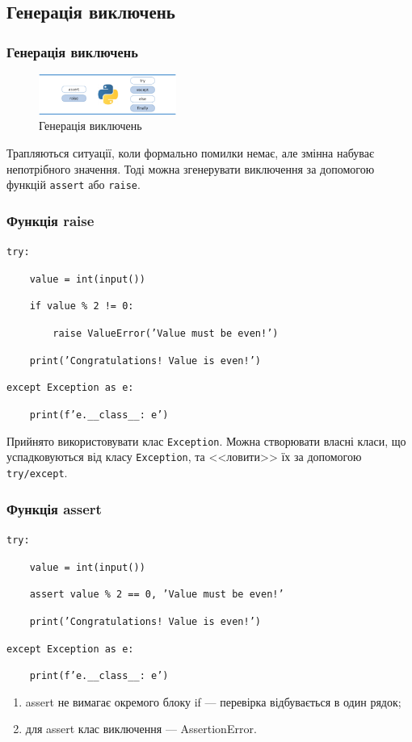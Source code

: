 \subsection{Генерація виключень} 
\begin{frame}
\frametitle{Генерація виключень}
\begin{figure}
  \begin{center}
    \includegraphics[width=0.4\textwidth,height=0.2\textheight]{pictures/assert-raise.png}
  \caption{Генерація виключень}
\label{function}
  \end{center}
\end{figure}

Трапляються ситуації, коли формально помилки немає, але змінна набуває непотрібного значення. Тоді можна згенерувати виключення за допомогою функцій \texttt{assert} або \texttt{raise}.

\end{frame}

\begin{frame}
\frametitle{Функція raise}
\texttt{try:}
    
\texttt{~~~~value = int(input())}

\texttt{~~~~if value \% 2 != 0:}

\texttt{~~~~~~~~raise ValueError('Value must be even!')}

\texttt{~~~~print('Congratulations! Value is even!')}

\texttt{except Exception as e:}

\texttt{~~~~print(f'{e.\_\_class\_\_}: {e}')}

Прийнято використовувати клас \texttt{Exception}. Можна створювати власні класи, що успадковуються від класу \texttt{Exception}, та <<ловити>> їх за допомогою \texttt{try/except}.
\end{frame}


\begin{frame}
\frametitle{Функція assert}

\texttt{try:}
    
\texttt{~~~~value = int(input())}

\texttt{~~~~assert value \% 2 == 0, 'Value must be even!'}

\texttt{~~~~print('Congratulations! Value is even!')}

\texttt{except Exception as e:}

\texttt{~~~~print(f'{e.\_\_class\_\_}: {e}')}

\begin{enumerate}
  \item assert не вимагає окремого блоку if — перевірка відбувається в один рядок;
  \item для assert клас виключення — AssertionError.

\end{enumerate}
\end{frame}
